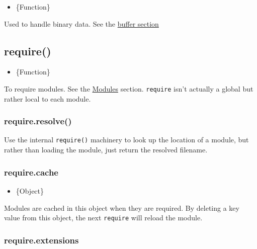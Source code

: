 \begin{itemize}
\itemsep1pt\parskip0pt
\item
  \{Function\}
\end{itemize}

Used to handle binary data. See the \href{buffer.html}{buffer section}

\subsection{require()}\label{require}

\begin{itemize}
\itemsep1pt\parskip0pt
\item
  \{Function\}
\end{itemize}

To require modules. See the
\href{modules.html\#modules_modules}{Modules} section. \texttt{require}
isn't actually a global but rather local to each module.

\subsubsection{require.resolve()}\label{require.resolve}

Use the internal \texttt{require()} machinery to look up the location of
a module, but rather than loading the module, just return the resolved
filename.

\subsubsection{require.cache}\label{require.cache}

\begin{itemize}
\itemsep1pt\parskip0pt
\item
  \{Object\}
\end{itemize}

Modules are cached in this object when they are required. By deleting a
key value from this object, the next \texttt{require} will reload the
module.

\subsubsection{require.extensions}\label{require.extensions}

\begin{Shaded}
\begin{Highlighting}[]
 
\end{Highlighting}
\end{Shaded}


